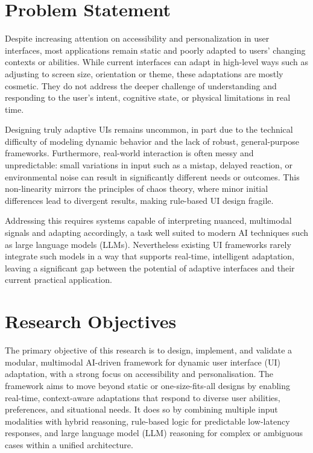 \documentclass[openany]{book}
\begin{document}
\section{Problem Statement}
Despite increasing attention on accessibility and personalization in user interfaces, most applications remain static and poorly adapted to users' changing contexts or abilities. While current interfaces can adapt in high-level ways such as adjusting to screen size, orientation or theme, these adaptations are mostly cosmetic. They do not address the deeper challenge of understanding and responding to the user's intent, cognitive state, or physical limitations in real time.

Designing truly adaptive UIs remains uncommon, in part due to the technical difficulty of modeling dynamic behavior and the lack of robust, general-purpose frameworks. Furthermore, real-world interaction is often messy and unpredictable: small variations in input such as a mistap, delayed reaction, or environmental noise can result in significantly different needs or outcomes. This non-linearity mirrors the principles of chaos theory, where minor initial differences lead to divergent results, making rule-based UI design fragile.

Addressing this requires systems capable of interpreting nuanced, multimodal signals and adapting accordingly, a task well suited to modern AI techniques such as large language models (LLMs). Nevertheless existing UI frameworks rarely integrate such models in a way that supports real-time, intelligent adaptation, leaving a significant gap between the potential of adaptive interfaces and their current practical application.

\newpage

\section{Research Objectives}

The primary objective of this research is to design, implement, and validate a modular, multimodal AI-driven framework for dynamic user interface (UI) adaptation, with a strong focus on accessibility and personalisation. The framework aims to move beyond static or one-size-fits-all designs by enabling real-time, context-aware adaptations that respond to diverse user abilities, preferences, and situational needs. It does so by combining multiple input modalities with hybrid reasoning, rule-based logic for predictable low-latency responses, and large language model (LLM) reasoning for complex or ambiguous cases within a unified architecture.  
\end{document}
